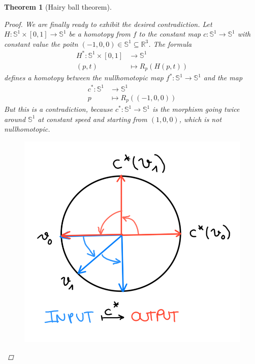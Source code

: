 \documentclass[A4paper, 12pt, british, reqno]{amsart}
\newcommand{\R}{\mathbb{R}} %
\newcommand{\bbS}{\mathbb{S}}
\theoremstyle{plain}
\newtheorem{thm}{Theorem}[section]
\theoremstyle{definition}
\theoremstyle{remark}
\theoremstyle{plain}
\theoremstyle{definition}
\theoremstyle{remark}
\theoremstyle{plain}
\theoremstyle{definition}
\theoremstyle{remark}
\begin{document}
\begin{thm}[Hairy ball theorem]
\begin{proof}
	We are finally ready to exhibit the desired contradiction.
	Let $H\colon \bbS^{1}\times [0,1]\to \bbS^{1}$ be a homotopy from $f$ to the constant map $c\colon \bbS^{1}\to \bbS^{1}$ with constant value the poitn $(-1,0,0)\in \bbS^{1}\subseteq \R^{3}$.
	The formula
	\begin{align*}
	    H^{*}\colon \bbS^{1}\times [0,1] & \longrightarrow \bbS^{1} \\
	    (p,t) & \longmapsto R_{p}(H(p,t))
	\end{align*}
	defines a homotopy between the nullhomotopic map $f^{*}\colon \bbS^{1}\to \bbS^{1}$ and the map
	\begin{align*}
	    c^{*}\colon \bbS^{1} & \longrightarrow \bbS^{1} \\
	    p  & \longmapsto R_{p}((-1,0,0))
	\end{align*}
	But this is a contradiction, because $c^{*}\colon \bbS^{1}\to \bbS^{1}$ is the morphism going twice around $\bbS^{1}$ at constant speed and starting from $(1,0,0)$, which is not nullhomotopic.
	\begin{figure}[htp]
	    \centering
	    \includegraphics[scale=.16]{circle.png}
	\end{figure}

    \end{proof}
\end{thm}
\end{document}
